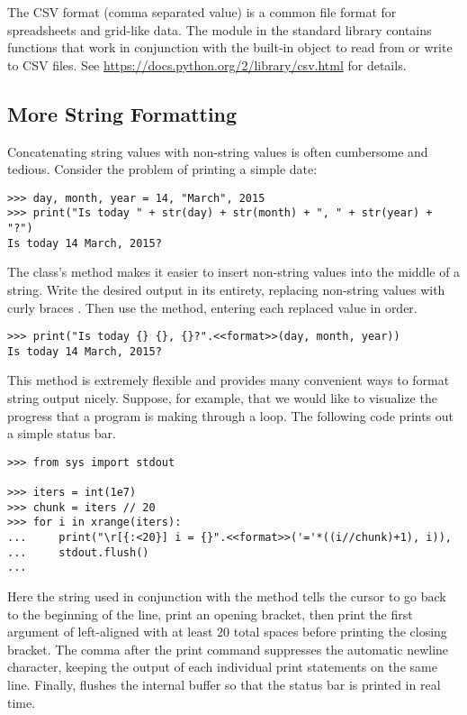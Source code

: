 The CSV format (comma separated value) is a common file format for spreadsheets and grid-like data.
The  module in the standard library contains functions that work in conjunction with the built-in  object to read from or write to CSV files.
See \url{https://docs.python.org/2/library/csv.html} for details.

\newpage

\subsection*{More String Formatting} %

Concatenating string values with non-string values is often cumbersome and tedious.
Consider the problem of printing a simple date:

\begin{lstlisting}
>>> day, month, year = 14, "March", 2015
>>> print("Is today " + str(day) + str(month) + ", " + str(year) + "?")
Is today 14 March, 2015?
\end{lstlisting}

The  class's  method makes it easier to insert non-string values into the middle of a string.
Write the desired output in its entirety, replacing non-string values with curly braces \li{\{\}}.
Then use the  method, entering each replaced value in order.

\begin{lstlisting}
>>> print("Is today {} {}, {}?".<<format>>(day, month, year))
Is today 14 March, 2015?
\end{lstlisting}

This method is extremely flexible and provides many convenient ways to format string output nicely.
Suppose, for example, that we would like to visualize the progress that a program is making through a loop.
The following code prints out a simple status bar.

\begin{lstlisting}
>>> from sys import stdout

>>> iters = int(1e7)
>>> chunk = iters // 20
>>> for i in xrange(iters):
...     print("\r[{:<20}] i = {}".<<format>>('='*((i//chunk)+1), i)),
...     stdout.flush()
...
\end{lstlisting}

Here the string  used in conjunction with the  method tells the cursor to go back to the beginning of the line, print an opening bracket, then print the first argument of  left-aligned with at least $20$ total spaces before printing the closing bracket.
The comma after the print command suppresses the automatic newline character, keeping the output of each individual print statements on the same line.
Finally,  flushes the internal buffer so that the status bar is printed in real time.

